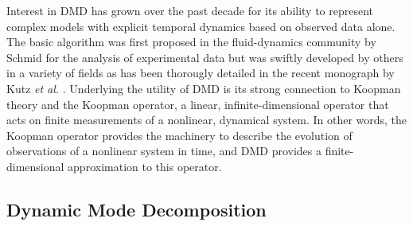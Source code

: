 \documentclass{anstrans}
\begin{document}
Interest in DMD has grown over the past decade for its ability to represent complex models with explicit temporal dynamics based on observed data alone.  
The basic algorithm was first proposed in the fluid-dynamics community by Schmid for the analysis of experimental data \cite{schmid2010dynamic} but was swiftly developed by others in a variety of fields as has been thorougly detailed in the recent monograph by Kutz {\it et al.} \cite{kutz2016dynamic}.
Underlying the utility of DMD is its strong connection to Koopman theory and the Koopman operator, a linear, infinite-dimensional operator that acts on finite measurements of a nonlinear, dynamical system.
In other words, the Koopman operator provides the machinery to describe the evolution of observations of a nonlinear system in time, and DMD provides a finite-dimensional approximation to this operator.

\subsection{Dynamic Mode Decomposition} 
\end{document}
